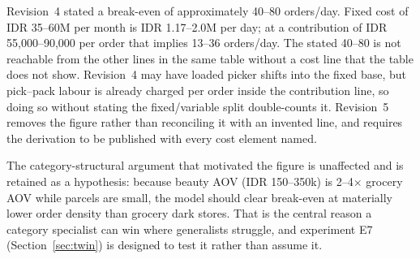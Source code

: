 \begin{remark}
Revision~4 stated a break-even of approximately 40--80 orders/day. Fixed cost of IDR 35--60M per month is IDR 1.17--2.0M per day; at a contribution of IDR 55,000--90,000 per order that implies 13--36 orders/day. The stated 40--80 is not reachable from the other lines in the same table without a cost line that the table does not show. Revision~4 may have loaded picker shifts into the fixed base, but pick--pack labour is already charged per order inside the contribution line, so doing so without stating the fixed/variable split double-counts it. Revision~5 removes the figure rather than reconciling it with an invented line, and requires the derivation to be published with every cost element named. 

The category-structural argument that motivated the figure is unaffected and is retained as a hypothesis: because beauty AOV (IDR 150--350k) is 2--4$\times$ grocery AOV while parcels are small, the model should clear break-even at materially lower order density than grocery dark stores. That is the central reason a category specialist can win where generalists struggle, and experiment E7 (Section~\ref{sec:twin}) is designed to test it rather than assume it.
\end{remark}
